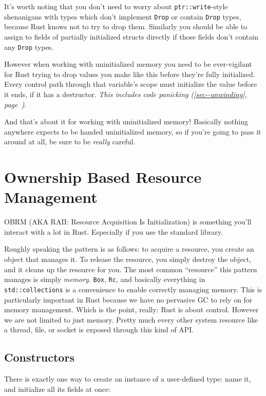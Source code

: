 \documentclass[a4paper,]{book}
\renewcommand*{\hyperref}[2][\ar]{%
  \def\ar{#2}%
  #2 (\autoref{#1}, page~\pageref{#1})}
\begin{document}
It's worth noting that you don't need to worry about
\texttt{ptr::write}-style shenanigans with types which don't implement
\texttt{Drop} or contain \texttt{Drop} types, because Rust knows not to
try to drop them. Similarly you should be able to assign to fields of
partially initialized structs directly if those fields don't contain any
\texttt{Drop} types.

However when working with uninitialized memory you need to be
ever-vigilant for Rust trying to drop values you make like this before
they're fully initialized. Every control path through that variable's
scope must initialize the value before it ends, if it has a destructor.
\emph{\hyperref[sec--unwinding]{This includes code panicking}}.

And that's about it for working with uninitialized memory! Basically
nothing anywhere expects to be handed uninitialized memory, so if you're
going to pass it around at all, be sure to be \emph{really} careful.

\chapter{Ownership Based Resource Management}\label{sec--obrm}

OBRM (AKA RAII: Resource Acquisition Is Initialization) is something
you'll interact with a lot in Rust. Especially if you use the standard
library.

Roughly speaking the pattern is as follows: to acquire a resource, you
create an object that manages it. To release the resource, you simply
destroy the object, and it cleans up the resource for you. The most
common ``resource'' this pattern manages is simply \emph{memory}.
\texttt{Box}, \texttt{Rc}, and basically everything in
\texttt{std::collections} is a convenience to enable correctly managing
memory. This is particularly important in Rust because we have no
pervasive GC to rely on for memory management. Which is the point,
really: Rust is about control. However we are not limited to just
memory. Pretty much every other system resource like a thread, file, or
socket is exposed through this kind of API.

\section{Constructors}\label{sec--constructors}

There is exactly one way to create an instance of a user-defined type:
name it, and initialize all its fields at once:
\end{document}

